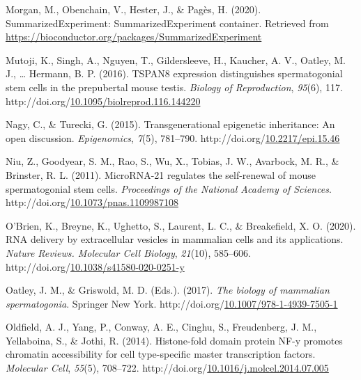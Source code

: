 \documentclass[12pt,twoside]{reedthesis}
\newlength{\cslhangindent}
\newenvironment{CSLReferences}[2] %
 {%
  \setlength{\parindent}{0pt}
  \ifodd #1 \everypar{\setlength{\hangindent}{\cslhangindent}}\ignorespaces\fi
  \ifnum #2 > 0
  \setlength{\parskip}{#2\baselineskip}
  \fi
 }%
 {}
\begin{document}
\begin{CSLReferences}{1}{0}
\leavevmode{}%
Morgan, M., Obenchain, V., Hester, J., \& Pagès, H. (2020). SummarizedExperiment: SummarizedExperiment container. Retrieved from \url{https://bioconductor.org/packages/SummarizedExperiment}

\leavevmode{}%
Mutoji, K., Singh, A., Nguyen, T., Gildersleeve, H., Kaucher, A. V., Oatley, M. J., \ldots{} Hermann, B. P. (2016). TSPAN8 expression distinguishes spermatogonial stem cells in the prepubertal mouse testis. \emph{Biology of Reproduction}, \emph{95}(6), 117. http://doi.org/\href{https://doi.org/10.1095/biolreprod.116.144220}{10.1095/biolreprod.116.144220}

\leavevmode{}%
Nagy, C., \& Turecki, G. (2015). Transgenerational epigenetic inheritance: An open discussion. \emph{Epigenomics}, \emph{7}(5), 781--790. http://doi.org/\href{https://doi.org/10.2217/epi.15.46}{10.2217/epi.15.46}

\leavevmode{}%
Niu, Z., Goodyear, S. M., Rao, S., Wu, X., Tobias, J. W., Avarbock, M. R., \& Brinster, R. L. (2011). MicroRNA-21 regulates the self-renewal of mouse spermatogonial stem cells. \emph{Proceedings of the National Academy of Sciences}. http://doi.org/\href{https://doi.org/10.1073/pnas.1109987108}{10.1073/pnas.1109987108}

\leavevmode{}%
O'Brien, K., Breyne, K., Ughetto, S., Laurent, L. C., \& Breakefield, X. O. (2020). RNA delivery by extracellular vesicles in mammalian cells and its applications. \emph{Nature Reviews. Molecular Cell Biology}, \emph{21}(10), 585--606. http://doi.org/\href{https://doi.org/10.1038/s41580-020-0251-y}{10.1038/s41580-020-0251-y}

\leavevmode{}%
Oatley, J. M., \& Griswold, M. D. (Eds.). (2017). \emph{The biology of mammalian spermatogonia}. Springer New York. http://doi.org/\href{https://doi.org/10.1007/978-1-4939-7505-1}{10.1007/978-1-4939-7505-1}

\leavevmode{}%
Oldfield, A. J., Yang, P., Conway, A. E., Cinghu, S., Freudenberg, J. M., Yellaboina, S., \& Jothi, R. (2014). Histone-fold domain protein NF-y promotes chromatin accessibility for cell type-specific master transcription factors. \emph{Molecular Cell}, \emph{55}(5), 708--722. http://doi.org/\href{https://doi.org/10.1016/j.molcel.2014.07.005}{10.1016/j.molcel.2014.07.005}


\end{CSLReferences}
\end{document}
